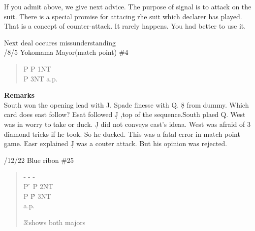 \vspace{0.5cm}
If you admit above, we give next advice.
The purpose of signal is to attack on the suit.
There is a special promise for attacing rhe suit
which declarer has played. That is a concept of
counter-attack. It rarely happens. You had better
to use it.

\vspace{0.5cm}
Next deal occures missunderstanding\\
/8/5 Yokomama Mayor(match point) \#4
\begin{quote}
%
  {}%
  {}
  {}%
  {}%
\end{quote}
\begin{quote}
\begin{bidding}
P  \s   \> P  \> 1NT \\
P \> 3NT \> a.p.
\end{bidding}
\end{quote}
{\bf Remarks}\\
South won the opening lead with \h J. Spade finesse with \s Q.
\d 8 from dummy. Which card does east follow?
Esat followed \d J ,top of the sequence.South plaed \d Q.
West was in worry to take or duck.
\d J did not conveys east's ideaa.
West was afraid of 3 diamond tricks if he took. So he ducked.
This was a fatal error in match point game.
Easr explained \d J was a couter attack. But his opinion was rejected.

\vspace{0.5cm}

/12/22 Blue ribon  \#25
\begin{quote}
%
  {}%
  {}
  {}%
  {}%
\end{quote}
\begin{quote}
\begin{bidding}
- \> -   \> -  \d \\
P \h \> P \> 2NT \\
P \h \. P \> 3NT \\
a.p.
\end{bidding}
3\h :shows both majors
\end{quote}

